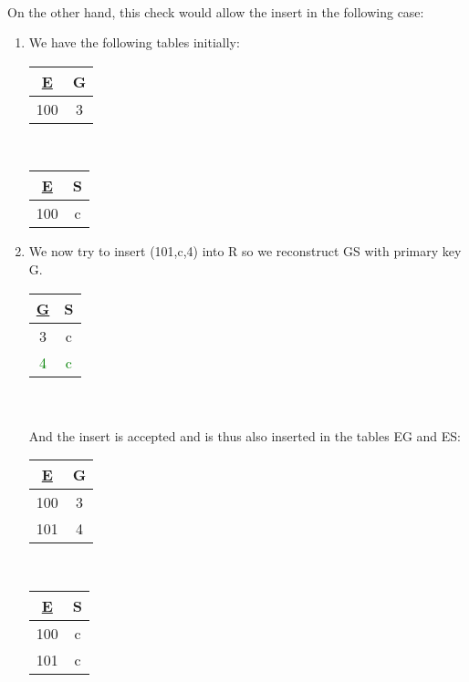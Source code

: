\documentclass[11pt]{article}
\begin{document}
\begin{enumerate}
    \\ On the other hand, this check would allow the insert in the following case:
    \begin{enumerate}
        \item We have the following tables initially:
        \\
        \begin{tabular}{|c|c|} 
            \hline
            \underline{E} & G \\
            \hline
            100 & 3 \\ 
            \hline
        \end{tabular}
        \ \ \ \ \ \ \ \ \ \ \ \ \ \ \ \ 
        \begin{tabular}{|c|c|} 
            \hline
            \underline{E} & S \\
            \hline
            100 & c \\ 
            \hline
        \end{tabular}
        \item We now try to insert (101,c,4) into R so we reconstruct GS with primary key G.
        \\
        \begin{tabular}{|c|c|} 
            \hline
            \underline{G} & S \\
            \hline
            3 & c \\ 
            \textcolor{green}{4} & \textcolor{green}{c} \\
            \hline
        \end{tabular}
        \\\\ And the insert is accepted and is thus also inserted in the tables EG and ES:
        \\
        \begin{tabular}{|c|c|} 
            \hline
            \underline{E} & G \\
            \hline
            100 & 3 \\ 
            101 & 4 \\
            \hline
        \end{tabular}
        \ \ \ \ \ \ \ \ \ \ \ \ \ \ \ \ 
        \begin{tabular}{|c|c|} 
            \hline
            \underline{E} & S \\
            \hline
            100 & c \\ 
            101 & c \\ 
            \hline
        \end{tabular}
    \end{enumerate}
\end{enumerate}
\end{document}
